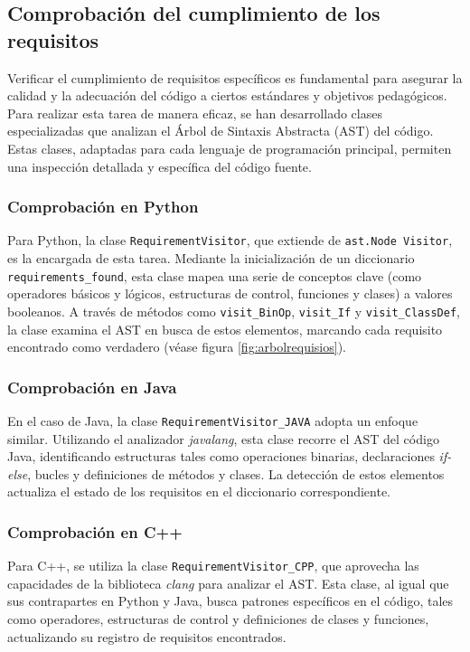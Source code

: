 \subsection{Comprobación del cumplimiento de los requisitos}

Verificar el cumplimiento de requisitos específicos es fundamental para asegurar la calidad y la adecuación del código a ciertos estándares y objetivos pedagógicos. Para realizar esta tarea de manera eficaz, se han desarrollado clases especializadas que analizan el Árbol de Sintaxis Abstracta (AST) \cite{astlibrary} del código. Estas clases, adaptadas para cada lenguaje de programación principal, permiten una inspección detallada y específica del código fuente.

\subsubsection*{Comprobación en Python}

Para Python, la clase \texttt{RequirementVisitor}, que extiende de \texttt{ast.Node Visitor}, es la encargada de esta tarea. Mediante la inicialización de un diccionario \texttt{requirements\_found}, esta clase mapea una serie de conceptos clave (como operadores básicos y lógicos, estructuras de control, funciones y clases) a valores booleanos. A través de métodos como \texttt{visit\_BinOp}, \texttt{visit\_If} y \texttt{visit\_ClassDef}, la clase examina el AST en busca de estos elementos, marcando cada requisito encontrado como verdadero  (véase figura \ref{fig:arbolrequisios}).

\subsubsection*{Comprobación en Java}

En el caso de Java, la clase \texttt{RequirementVisitor\_JAVA} adopta un enfoque similar. Utilizando el analizador \textit{javalang}, esta clase recorre el AST del código Java, identificando estructuras tales como operaciones binarias, declaraciones \textit{if-else}, bucles y definiciones de métodos y clases. La detección de estos elementos actualiza el estado de los requisitos en el diccionario correspondiente.

\subsubsection*{Comprobación en C++}

Para C++, se utiliza la clase \texttt{RequirementVisitor\_CPP}, que aprovecha las capacidades de la biblioteca \textit{clang} para analizar el AST. Esta clase, al igual que sus contrapartes en Python y Java, busca patrones específicos en el código, tales como operadores, estructuras de control y definiciones de clases y funciones, actualizando su registro de requisitos encontrados.

